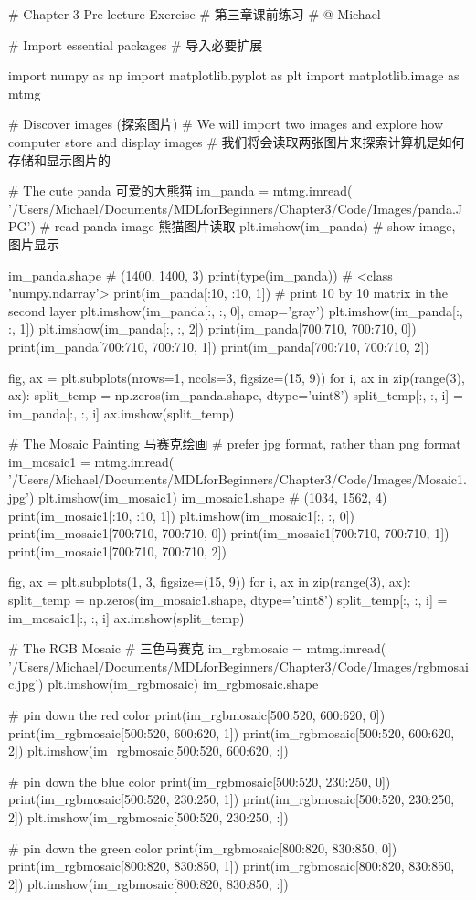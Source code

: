\documentclass[12pt]{article}
\numberwithin{figure}{section}
\numberwithin{equation}{section}
\begin{document}
\begin{python}
# Chapter 3 Pre-lecture Exercise
# 第三章课前练习
# @ Michael

# Import essential packages
# 导入必要扩展

import numpy as np
import matplotlib.pyplot as plt
import matplotlib.image as mtmg

# Discover images (探索图片)
# We will import two images and explore how computer store and display images
# 我们将会读取两张图片来探索计算机是如何存储和显示图片的

# The cute panda 可爱的大熊猫
im_panda = mtmg.imread(
    '/Users/Michael/Documents/MDLforBeginners/Chapter3/Code/Images/panda.JPG')
# read panda image 熊猫图片读取
plt.imshow(im_panda)  # show image, 图片显示

im_panda.shape  # (1400, 1400, 3)
print(type(im_panda))   # <class 'numpy.ndarray'>
print(im_panda[:10, :10, 1])  # print 10 by 10 matrix in the second layer
plt.imshow(im_panda[:, :, 0], cmap='gray')
plt.imshow(im_panda[:, :, 1])
plt.imshow(im_panda[:, :, 2])
print(im_panda[700:710, 700:710, 0])
print(im_panda[700:710, 700:710, 1])
print(im_panda[700:710, 700:710, 2])

fig, ax = plt.subplots(nrows=1, ncols=3, figsize=(15, 9))
for i, ax in zip(range(3), ax):
    split_temp = np.zeros(im_panda.shape, dtype='uint8')
    split_temp[:, :, i] = im_panda[:, :, i]
    ax.imshow(split_temp)


# The Mosaic Painting 马赛克绘画
# prefer jpg format, rather than png format
im_mosaic1 = mtmg.imread(
    '/Users/Michael/Documents/MDLforBeginners/Chapter3/Code/Images/Mosaic1.jpg')
plt.imshow(im_mosaic1)
im_mosaic1.shape  # (1034, 1562, 4)
print(im_mosaic1[:10, :10, 1])
plt.imshow(im_mosaic1[:, :, 0])
print(im_mosaic1[700:710, 700:710, 0])
print(im_mosaic1[700:710, 700:710, 1])
print(im_mosaic1[700:710, 700:710, 2])

fig, ax = plt.subplots(1, 3, figsize=(15, 9))
for i, ax in zip(range(3), ax):
    split_temp = np.zeros(im_mosaic1.shape, dtype='uint8')
    split_temp[:, :, i] = im_mosaic1[:, :, i]
    ax.imshow(split_temp)


# The RGB Mosaic
# 三色马赛克
im_rgbmosaic = mtmg.imread(
    '/Users/Michael/Documents/MDLforBeginners/Chapter3/Code/Images/rgbmosaic.jpg')
plt.imshow(im_rgbmosaic)
im_rgbmosaic.shape

# pin down the red color
print(im_rgbmosaic[500:520, 600:620, 0])
print(im_rgbmosaic[500:520, 600:620, 1])
print(im_rgbmosaic[500:520, 600:620, 2])
plt.imshow(im_rgbmosaic[500:520, 600:620, :])

# pin down the blue color
print(im_rgbmosaic[500:520, 230:250, 0])
print(im_rgbmosaic[500:520, 230:250, 1])
print(im_rgbmosaic[500:520, 230:250, 2])
plt.imshow(im_rgbmosaic[500:520, 230:250, :])

# pin down the green color
print(im_rgbmosaic[800:820, 830:850, 0])
print(im_rgbmosaic[800:820, 830:850, 1])
print(im_rgbmosaic[800:820, 830:850, 2])
plt.imshow(im_rgbmosaic[800:820, 830:850, :])	
\end{python}
\end{document}
